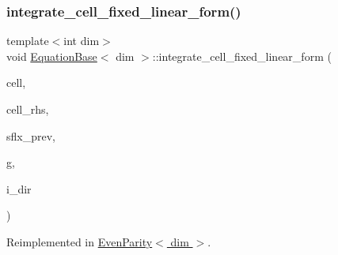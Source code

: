\subsubsection{\texorpdfstring{integrate\+\_\+cell\+\_\+fixed\+\_\+linear\+\_\+form()}{integrate\_cell\_fixed\_linear\_form()}}
{\footnotesize\ttfamily template$<$int dim$>$ \\
void \hyperlink{class_equation_base}{Equation\+Base}$<$ dim $>$\+::integrate\+\_\+cell\+\_\+fixed\+\_\+linear\+\_\+form (\begin{DoxyParamCaption}\item[{typename Do\+F\+Handler$<$ dim $>$\+::active\+\_\+cell\+\_\+iterator \&}]{cell,  }\item[{Vector$<$ double $>$ \&}]{cell\+\_\+rhs,  }\item[{std\+::vector$<$ Vector$<$ double $>$ $>$ \&}]{sflx\+\_\+prev,  }\item[{const unsigned int \&}]{g,  }\item[{const unsigned int \&}]{i\+\_\+dir }\end{DoxyParamCaption})\hspace{0.3cm}{\ttfamily [virtual]}}



Reimplemented in \hyperlink{class_even_parity_a5efaf943f1bde0b3f9a62ea8f5dc5ff0}{Even\+Parity$<$ dim $>$}.

\mbox{\label{class_equation_base_af56caa04c80d8f388e116307930d0063}} 
